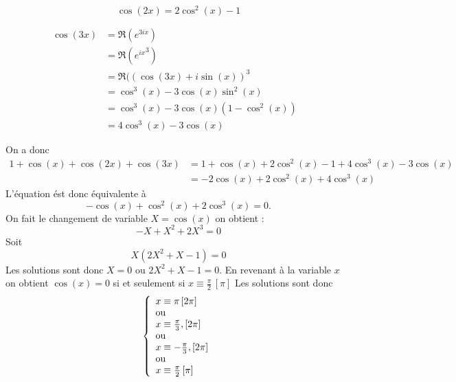 \documentclass[a4paper, 11pt]{article}
\begin{document}
\begin{cor}
$$\cos(2x)=2\cos^2(x)-1$$

\begin{align*}
\cos(3x) &=\Re(e^{3ix})&\\
			&=\Re({e^{ix}}^3)\\
			&=\Re({(\cos(3x)+i\sin(x))}^3\\ 
			&=\cos^3(x)-3\cos(x) \sin^2(x)\\
			&=\cos^3(x)-3\cos(x) (1-\cos^2(x))\\
			&=4\cos^3(x)-3\cos(x)
\end{align*}


On a donc 
\begin{align*}
1+\cos{(x)}+\cos{(2x)}+\cos{(3x)}&= 1+\cos(x) + 2\cos^2(x)-1 + 4\cos^3(x)-3\cos(x)\\
													&= -2\cos(x) + 2\cos^2(x)+ 4\cos^3(x)
\end{align*}
L'équation ést donc équivalente à 
$$-\cos(x)+\cos^2(x)+2\cos^3(x)=0.$$
On fait le changement de variable $X=\cos(x)$ on obtient : 
$$-X+X^2+2X^3=0$$
Soit $$X(2X^2+X-1)=0$$
Les solutions sont donc $X=0$ ou $2X^2+X-1=0$. En revenant à la variable $x$ on obtient 
$\cos(x)=0$ si et seulement si $x\equiv \frac{\pi}{2}\, [\pi]$
Les solutions sont donc 
$$
\left\{ \begin{array}{l}
x \equiv  \pi\, [2\pi] \\
\textmd{ou }\\
x \equiv \frac{\pi}{3}, [2\pi] \\
\textmd{ou }\\
x \equiv -\frac{\pi}{3}, [2\pi] \\
\textmd{ou }\\
x\equiv \frac{\pi}{2}\, [\pi]
\end{array}\right.$$






\end{cor}

\end{document}
